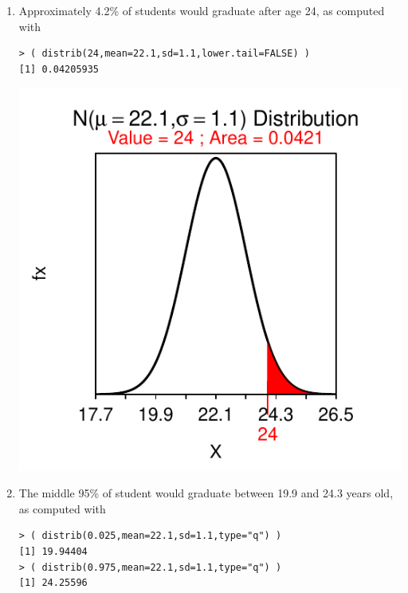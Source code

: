 \documentclass[10pt,openany]{book}\usepackage[]{graphicx}\usepackage[]{color}
\makeatletter
\newenvironment{kframe}{%
 \def\at@end@of@kframe{}%
 \ifinner\ifhmode%
  \def\at@end@of@kframe{\end{minipage}}%
  \begin{minipage}{\columnwidth}%
 \fi\fi%
 \def\FrameCommand##1{\hskip\@totalleftmargin \hskip-\fboxsep
 \colorbox{shadecolor}{##1}\hskip-\fboxsep
     \hskip-\linewidth \hskip-\@totalleftmargin \hskip\columnwidth}%
 \MakeFramed {\advance\hsize-\width
   \@totalleftmargin\z@ \linewidth\hsize
   \@setminipage}}%
 {\par\unskip\endMakeFramed%
 \at@end@of@kframe}
\newenvironment{knitrout}{}{} %
\makeatother
\begin{document}
\begin{itemize}
\begin{enumerate}
\begin{knitrout}
{}



\end{knitrout}
      \item Approximately 4.2\% of students would graduate after age 24, as computed with
\begin{knitrout}
\color{fgcolor}\begin{kframe}
\begin{verbatim}
> ( distrib(24,mean=22.1,sd=1.1,lower.tail=FALSE) )
[1] 0.04205935
\end{verbatim}
\end{kframe}

{\centering \includegraphics[width=.4\linewidth]{Figs/unnamed-chunk-225-1} 

}



\end{knitrout}
      \item The middle 95\% of student would graduate between 19.9 and 24.3 years old, as computed with
\begin{knitrout}
\color{fgcolor}\begin{kframe}
\begin{verbatim}
> ( distrib(0.025,mean=22.1,sd=1.1,type="q") )
[1] 19.94404
> ( distrib(0.975,mean=22.1,sd=1.1,type="q") )
[1] 24.25596
\end{verbatim}
\end{kframe}


\end{knitrout}
\end{enumerate}
\end{itemize}
\end{document}
